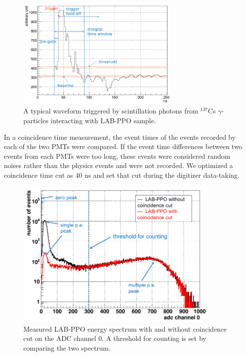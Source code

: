 \begin{figure}[htbp]
	\centering	
	\includegraphics[width=8cm]{teLS_waveform.png}
	\caption[A typical triggered waveform.]{A typical waveform triggered by scintillation photons from $^{137}$Cs $\gamma$-particles interacting with LAB-PPO sample.}
	\label{teLSwaveform}
\end{figure}

In a coincidence time measurement, the event times of the events recorded by each of the two PMTs were compared. If the event time differences between two events from each PMTs were too long, these events were considered random noises rather than the physics events and were not recorded. We optimized a coincidence time cut as 40 ns and set that cut during the digitizer data-taking. 

\begin{figure}[htbp]
	\centering	
	\includegraphics[width=10cm]{TeLScoinCut.png}
	\caption[Measured LAB-PPO energy spectrum with and without coincidence cut]{Measured LAB-PPO energy spectrum with and without coincidence cut on the ADC channel 0. A threshold for counting is set by comparing the two spectrum.}
	\label{teLScoinCut}
\end{figure}

